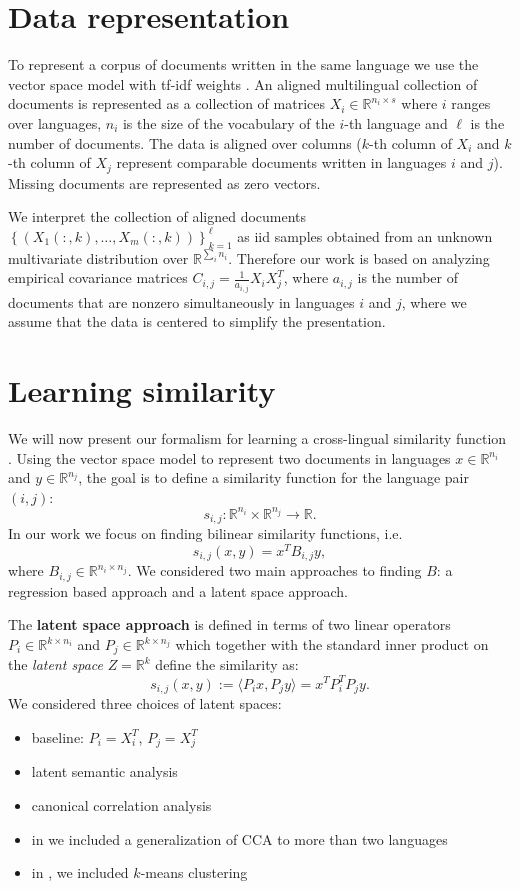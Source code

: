 \documentclass{article} %
\newcommand{\RR}{\mathbb{R}}
\begin{document}
\section{Data representation}

To represent a corpus of documents written in the same language we use the vector space model with tf-idf weights \cite{Salton88term-weightingapproaches}. An aligned multilingual collection of documents is represented as a collection of matrices $X_i \in \RR^{n_i \times s}$ where $i$ ranges over languages, $n_i$ is the size of the vocabulary of the $i$-th language and $\ell$ is the number of documents. The data is aligned over columns ($k$-th column of $X_i$ and $k$-th column of $X_j$ represent comparable documents written in languages $i$ and $j$). Missing documents are represented as zero vectors.

We interpret the collection of aligned documents $\left\{ \left( X_1\left(:,k\right), \ldots, X_m\left(:,k\right) \right) \right\}_{k=1}^{\ell}$ as iid samples obtained from an unknown multivariate distribution over $\RR^{\sum_i{n_i}}.$ Therefore our work is based on analyzing empirical covariance matrices $C_{i,j} = \frac{1}{a_{i,j}}X_i X_j^T$, where $a_{i,j}$ is the number of documents that are nonzero simultaneously in languages $i$ and $j$, where we assume that the data is centered to simplify the presentation.

\section{Learning similarity}
We will now present our formalism for learning a cross-lingual similarity function \cite{nips2}. Using the vector space model to represent two documents in languages $x\in \RR^{n_i}$ and $y \in \RR^{n_j}$, the goal is to define a similarity function for the language pair $(i,j)$: $$s_{i,j}: \RR^{n_i}\times \RR^{n_j} \rightarrow \RR.$$
In our work we focus on finding bilinear similarity functions, i.e. $$s_{i,j}\left(x,y\right) = x^T B_{i,j} y,$$ where $B_{i,j} \in \RR^{n_i \times n_j}$. We considered two main approaches to finding $B$: a regression based approach and a latent space approach.

The \textbf{latent space approach} is defined in terms of two linear operators $P_{i} \in \RR^{k \times n_i}$ and $P_{j} \in \RR^{k \times n_j}$ which together with the standard inner product on the \emph{latent space} $Z = \RR^k$ define the similarity as:
$$s_{i,j}(x,y) := \langle P_i x, P_j y \rangle = x^T P_i^T P_j y.$$
We considered three choices of latent spaces:
\begin{itemize}
\item baseline: $P_i = X_i^T$, $P_j = X_j^T$
\item latent semantic analysis \cite{lsi}
\item canonical correlation analysis \cite{HardoonCCA}
\item in \cite{nips3} we included a generalization of CCA to more than two languages
\item in \cite{iti},\cite{nips} we included $k$-means clustering
\end{itemize}
\end{document}
